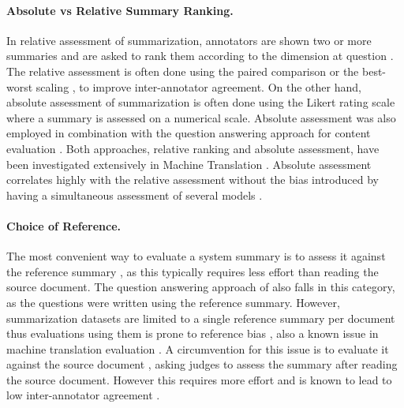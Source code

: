 \documentclass[11pt,a4paper]{article}
\begin{document}
\paragraph{Absolute vs Relative Summary Ranking.} 
In relative assessment of summarization, 
annotators are shown two or more summaries and are asked to rank them according to the dimension at question \citep{Yang2017b,Chen2018a,narayan-sidenet18,Guo2018a,Krishna2018a}. The relative assessment is often done using the paired comparison \citep{Thurstone1994} or the best-worst scaling \citep{Woodworth1991,Louviere2015}, to improve inter-annotator agreement. On the other hand,
absolute assessment of summarization \cite{Li2018a,Song2018,Kryscinski2018,Hsu2018,Hardy2018} 
is often done using the Likert rating scale \citep{Likert1932} where a summary is assessed on a numerical scale. 
Absolute assessment was also employed in combination with the question answering approach for content evaluation
\citep{narayan18xsum,mendesetalnaacl19}. Both approaches, relative ranking and absolute assessment, have been investigated extensively in Machine Translation \citep{Bojar2016, Bojar2017}.  
 Absolute assessment correlates highly with the relative assessment without the bias introduced by having a simultaneous assessment of several models \citep{Bojar2011}.

\paragraph{Choice of Reference.} 
The most convenient
way to evaluate a system summary is to assess it against the reference summary \citep{Celikyilmaz2018,Yang2017b,Peyrard2018a}, as this typically requires less effort than reading the source document. The question answering approach of \citet{narayan18xsum,Narayan2018} also falls in this category, as the questions were written using the reference summary. However, summarization datasets are limited to a single reference summary per document \citep{Sandhaus2008,Hermann2015,newsroom_N181065,narayan18xsum} thus evaluations using them is prone to reference bias \citep{Louis2013}, also a known issue in machine translation evaluation \citep{fomicheva2016reference}. A circumvention for this issue is to evaluate it against the source document \citep{Song2018,narayan-sidenet18,Hsu2018,Kryscinski2018}, asking judges to assess the summary after reading the source document. However this requires more effort and is known to lead to low inter-annotator agreement \citep{Nenkova2004a}. 
\end{document}
